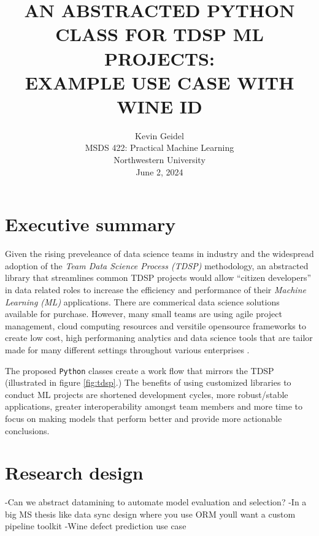 \documentclass[12pt,letterpaper]{article}
\begin{document}
\selectfont
{}
\doublespacing
\setlength{\droptitle}{1in} 

\title{\large{AN ABSTRACTED PYTHON CLASS FOR TDSP ML PROJECTS: \\ EXAMPLE USE CASE WITH WINE ID \\\vspace{1.2in}}}

\author{
Kevin Geidel \\
MSDS 422: Practical Machine Learning \\
Northwestern University \\
June 2, 2024 \\
}

\date{}
\maketitle
\thispagestyle{empty}	
\clearpage
\setcounter{page}{1}

\section{Executive summary}
\tab Given the rising preveleance of data science teams in industry and the widespread adoption of the \emph{Team Data Science Process (TDSP)} methodology, an abstracted library that streamlines common TDSP projects would allow ``citizen developers'' in data related roles to increase the efficiency and performance of their \emph{Machine Learning (ML)} applications. There are commerical data science solutions available for purchase. However, many small teams are using agile project management, cloud computing resources and versitile opensource frameworks to create low cost, high performaning analytics and data science tools that are tailor made for many different settings throughout various enterprises \citep{Hyatt:2024}.

The proposed \texttt{Python} classes create a work flow that mirrors the TDSP (illustrated in figure \ref{fig:tdsp}.) The benefits of using customized libraries to conduct ML projects are shortened development cycles, more robust/stable applications, greater interoperability amongst team members and more time to focus on making models that perform better and provide more actionable conclusions.

\section{Research design}
\tab 
-Can we abstract datamining to automate model evaluation and selection?
-In a big MS thesis like data sync design where you use ORM youll want a custom pipeline toolkit 
-Wine defect prediction use case
\end{document}

